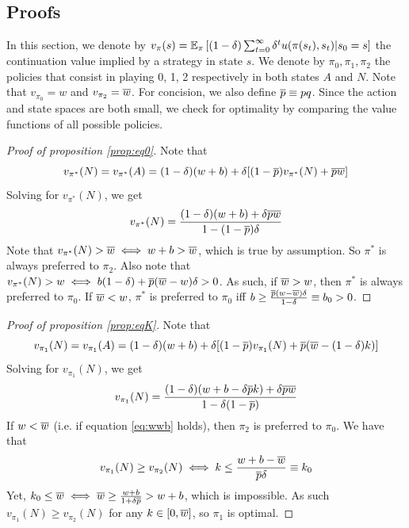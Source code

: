 {%

% 

\newpage

\appendixpage


\subsection{Proofs}
\label{app:proofs}

In this section, we denote by $v_\pi(s) = \mathbb{E}_\pi \left[ (1-\delta) \sum_{t = 0}^\infty \delta^t u(\pi(s_t), s_t) | s_0 = s \right]$ the continuation value implied by a strategy in state $s$. We denote by $\pi_0, \pi_1, \pi_2$  the policies that consist in playing 0, 1, 2 respectively in both states $A$ and $N$. Note that $v_{\pi_0} = w$ and $v_{\pi_2} = \overline{w}$. For concision, we also define $\overline{p} \equiv pq$. Since the action and state spaces are both small, we check for optimality by comparing the value functions of all possible policies. 

\begin{proof}[Proof of proposition \ref{prop:eq0}]
    Note that 
    $$
    v_{\pi^*}(N) = v_{\pi^*}(A) = (1-\delta) (w+b) + \delta [(1-\overline{p}) v_{\pi^*}(N) + \overline{p} \overline{w}]
    $$
    Solving for $v_{\pi^*}(N)$, we get
    $$
    v_{\pi^*}(N) = \frac{(1-\delta)(w+b)+\delta \overline{p} \overline{w}}{1 - (1-\overline{p})\delta}
    $$
    Note that $v_{\pi^*}(N) > \overline{w} \iff w + b > \overline{w}$, which is true by assumption. So $\pi^*$ is always preferred to $\pi_2$. Also note that $v_{\pi^*}(N) > w \iff b (1-\delta) + \overline{p} (\overline{w} - w) \delta > 0$. As such, if $\overline{w} > w$, then $\pi^*$ is always preferred to $\pi_0$. If $\overline{w} < w$,  $\pi^*$  is preferred to $\pi_0$ iff $b \geq \frac{\overline{p} (w - \overline{w}) \delta}{1-\delta} \equiv b_0 > 0$.
\end{proof}

\begin{proof}[Proof of proposition \ref{prop:eqK}]
    Note that 
    $$
    v_{\pi_1}(N) = v_{\pi_1}(A) = (1-\delta) (w+b) + \delta [(1-\overline{p}) v_{\pi_1}(N) + \overline{p} (\overline{w} - (1-\delta) k)]
    $$
    Solving for $v_{\pi_1}(N)$, we get
    $$
    v_{\pi_1}(N) = \frac{(1-\delta)(w+b-\delta\overline{p} k)+\delta\overline{p} \overline{w}}{1-\delta(1-\overline{p})}
    $$
    If $w < \overline{w}$ (i.e. if equation \ref{eq:wwb} holds), then $\pi_2$ is preferred to $\pi_0$. We have that 
    $$
    v_{\pi_1}(N) \geq v_{\pi_2}(N) \iff k \leq \frac{w+b-\overline{w}}{\overline{p}\delta} \equiv k_0
    $$
    Yet, $k_0 \leq \overline{w} \iff \overline{w} \geq \frac{w+b}{1+\delta\overline{p}} > w+b$, which is impossible. As such $v_{\pi_1}(N) \geq v_{\pi_2}(N)$ for any $k \in [0,\overline{w}]$, so $\pi_1$ is optimal. 


\end{proof}}
